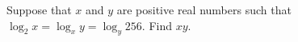 \begin{problem}
    Suppose that $x$ and $y$ are positive real numbers such that $\log_2 x = \log_x y = \log_y 256$. Find $xy$.
\end{problem}